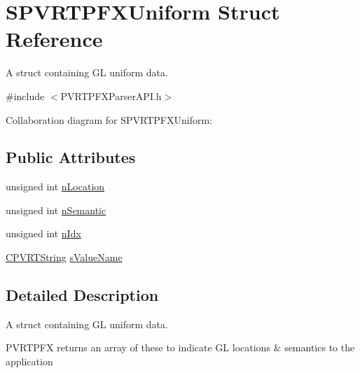 \hypertarget{struct_s_p_v_r_t_p_f_x_uniform}{\section{S\+P\+V\+R\+T\+P\+F\+X\+Uniform Struct Reference}
\label{struct_s_p_v_r_t_p_f_x_uniform}
}


A struct containing G\+L uniform data.  




{\ttfamily \#include $<$P\+V\+R\+T\+P\+F\+X\+Parser\+A\+P\+I.\+h$>$}



Collaboration diagram for S\+P\+V\+R\+T\+P\+F\+X\+Uniform\+:
\subsection*{Public Attributes}
\begin{DoxyCompactItemize}
\item 
unsigned int \hyperlink{struct_s_p_v_r_t_p_f_x_uniform_acd819c747bef7ef65a2673fe81f10827}{n\+Location}
\item 
unsigned int \hyperlink{struct_s_p_v_r_t_p_f_x_uniform_acfcb0809684e1de9e63c4fcb39cb0e4c}{n\+Semantic}
\item 
unsigned int \hyperlink{struct_s_p_v_r_t_p_f_x_uniform_a09dfcda8af5fd331adf4bbba56ed153b}{n\+Idx}
\item 
\hyperlink{class_c_p_v_r_t_string}{C\+P\+V\+R\+T\+String} \hyperlink{struct_s_p_v_r_t_p_f_x_uniform_a9a06b0bca0b8a4ccf07aee21bbbc8d5c}{s\+Value\+Name}
\end{DoxyCompactItemize}


\subsection{Detailed Description}
A struct containing G\+L uniform data. 





P\+V\+R\+T\+P\+F\+X returns an array of these to indicate G\+L locations \& semantics to the application 

